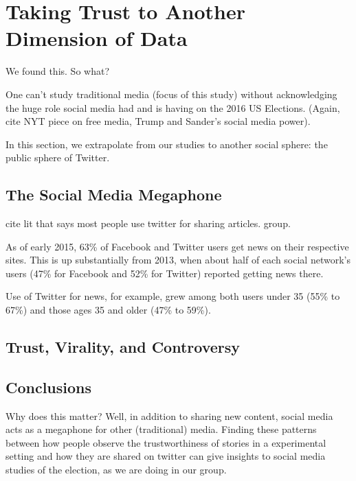 \chapter{Taking Trust to Another Dimension of Data}

We found this.
So what?

One can't study traditional media (focus of this study) without acknowledging the huge role social media had and is having on the 2016 US Elections. (Again, cite NYT piece on free media, Trump and Sander's social media power).

In this section, we extrapolate from our studies to another social sphere: the public sphere of Twitter. 



\section{The Social Media Megaphone}
cite lit that says most people use twitter for sharing articles.
group. 



As of early 2015, 63\% of Facebook and Twitter users get news on their respective sites. This is up substantially from 2013, when about half of each social network’s users (47\% for Facebook and 52\% for Twitter) reported getting news there.

Use of Twitter for news, for example, grew among both users under 35 (55\% to 67\%) and those ages 35 and older (47\% to 59\%). \cite{Pew-news-sharing}


\section{Trust, Virality, and Controversy}

\section{Conclusions}

Why does this matter?
Well, in addition to sharing new content, social media acts as a megaphone for other (traditional) media. Finding these patterns between how people observe the trustworthiness of stories in a experimental setting and how they are shared on twitter can give insights to social media studies of the election, as we are doing in our group.



















